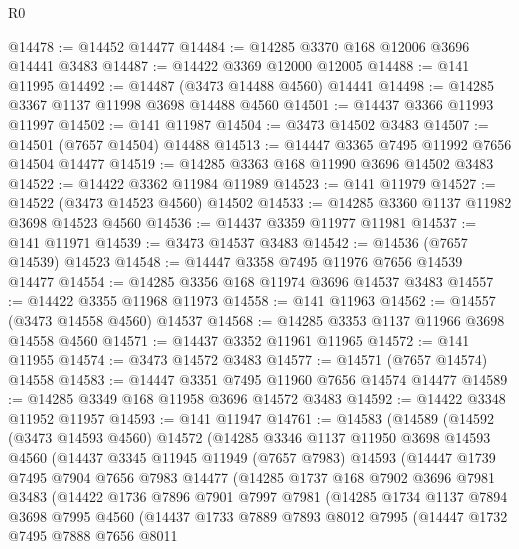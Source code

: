 \begin{lexlean}{R0}
\begin{coremodule}
@14478 := @14452 @14477
@14484 := @14285 @3370 @168 @12006 @3696 @14441 @3483
@14487 := @14422 @3369 @12000 @12005
@14488 := @141 @11995
@14492 := @14487 (@3473 @14488 @4560) @14441
@14498 := @14285 @3367 @1137 @11998 @3698 @14488 @4560
@14501 := @14437 @3366 @11993 @11997
@14502 := @141 @11987
@14504 := @3473 @14502 @3483
@14507 := @14501 (@7657 @14504) @14488
@14513 := @14447 @3365 @7495 @11992 @7656 @14504 @14477
@14519 := @14285 @3363 @168 @11990 @3696 @14502 @3483
@14522 := @14422 @3362 @11984 @11989
@14523 := @141 @11979
@14527 := @14522 (@3473 @14523 @4560) @14502
@14533 := @14285 @3360 @1137 @11982 @3698 @14523 @4560
@14536 := @14437 @3359 @11977 @11981
@14537 := @141 @11971
@14539 := @3473 @14537 @3483
@14542 := @14536 (@7657 @14539) @14523
@14548 := @14447 @3358 @7495 @11976 @7656 @14539 @14477
@14554 := @14285 @3356 @168 @11974 @3696 @14537 @3483
@14557 := @14422 @3355 @11968 @11973
@14558 := @141 @11963
@14562 := @14557 (@3473 @14558 @4560) @14537
@14568 := @14285 @3353 @1137 @11966 @3698 @14558 @4560
@14571 := @14437 @3352 @11961 @11965
@14572 := @141 @11955
@14574 := @3473 @14572 @3483
@14577 := @14571 (@7657 @14574) @14558
@14583 := @14447 @3351 @7495 @11960 @7656 @14574 @14477
@14589 := @14285 @3349 @168 @11958 @3696 @14572 @3483
@14592 := @14422 @3348 @11952 @11957
@14593 := @141 @11947
@14761 := @14583
    (@14589
      (@14592
        (@3473 @14593 @4560)
        @14572
        (@14285
          @3346
          @1137
          @11950
          @3698
          @14593
          @4560
          (@14437
            @3345
            @11945
            @11949
            (@7657 @7983)
            @14593
            (@14447
              @1739
              @7495
              @7904
              @7656
              @7983
              @14477
              (@14285
                @1737
                @168
                @7902
                @3696
                @7981
                @3483
                (@14422
                  @1736
                  @7896
                  @7901
                  @7997
                  @7981
                  (@14285
                    @1734
                    @1137
                    @7894
                    @3698
                    @7995
                    @4560
                    (@14437
                      @1733
                      @7889
                      @7893
                      @8012
                      @7995
                      (@14447
                        @1732
                        @7495
                        @7888
                        @7656
                        @8011

\end{coremodule}
\end{lexlean}
